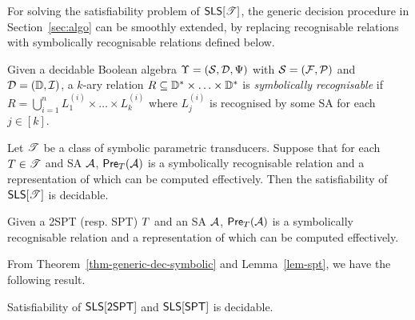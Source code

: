 For solving the satisfiability problem of $\textsf{SLS}[\mathscr{T}]$, the generic decision procedure in Section~\ref{sec:algo} can be smoothly extended, by replacing recognisable relations with symbolically recognisable relations defined below.

\begin{definition}
	Given a decidable Boolean algebra $\Upsilon=(\mathcal{S}, \mathcal{D}, \Psi)$ with $\mathcal{S} = ({\mathcal{F}}, {\mathcal{P}})$ and $\mathcal{D} = (\mathbb{D}, \mathcal{I})$, a $k$-ary relation $R \subseteq \mathbb{D}^*\times \ldots\times \mathbb{D}^*$ is \emph{symbolically recognisable} if $R=\bigcup_{i=1}^n L^{(i)}_1 \times \ldots \times L^{(i)}_k$ where $L^{(i)}_j$ is recognised by some SA for each $j\in [k]$.
\end{definition}


\begin{theorem}\label{thm-generic-dec-symbolic}
Let $\mathscr{T}$ be a class of symbolic parametric transducers. Suppose that %
for each $T \in \mathscr{T}$ and SA $\mathcal{A}$, $\textsf{Pre}_{T}(\mathcal{A})$ is a symbolically recognisable relation and a representation of which can be computed effectively. Then the satisfiability of $\textsf{SLS}[\mathscr{T}]$ is decidable.
\end{theorem}

\begin{lemma}\label{lem-spt}
Given a 2SPT (resp. SPT) $T$ and an SA $\mathcal{A}$, $\textsf{Pre}_{T}(\mathcal{A})$ is a symbolically recognisable relation and a representation of which can be computed effectively.
\end{lemma}

From Theorem~\ref{thm-generic-dec-symbolic} and Lemma~\ref{lem-spt}, we have the following result.
\begin{theorem}
Satisfiability of $\textsf{SLS}[\textsf{2SPT}]$ and $\textsf{SLS}[\textsf{SPT}]$ is decidable.
\end{theorem}




